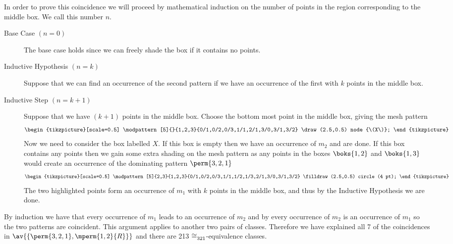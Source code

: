 In order to prove this coincidence we will proceed by mathematical
induction on the number of points in the region corresponding to the middle box.
We call this number \(n\).
\begin{description}
    \item [Base Case \((n=0)\)] The base case holds since we can freely shade the
        box if it contains no points.
    \item [Inductive Hypothesis \((n=k)\)] Suppose that we can find an occurrence
        of the second pattern if we have an occurrence of the first with \(k\) points
        in the middle box.
    \item [Inductive Step \((n=k+1)\)] Suppose that we have \((k+1)\) points in
        the middle box. Choose the bottom most point in the middle box, giving the
        mesh pattern
     \begin{equation*}
        \begin{tikzpicture}[scale=0.5]
            \modpattern[5]{}{1,2,3}{0/1,0/2,0/3,1/1,2/1,3/0,3/1,3/2}
            \draw (2.5,0.5) node {\(X\)};
        \end{tikzpicture}
    \end{equation*}
        Now we need to consider the box labelled \(X\). If this box is empty
        then we have an occurrence of \(m_2\) and are done. If this box contains
        any points then we gain some extra shading on the mesh pattern as any
        points in the boxes \(\boks{1,2}\) and \(\boks{1,3}\) would create an
        occurrence of the dominating pattern \(\perm{3,2,1}\)
     \begin{equation*}
        \begin{tikzpicture}[scale=0.5]
            \modpattern[5]{2,3}{1,2,3}{0/1,0/2,0/3,1/1,1/2,1/3,2/1,3/0,3/1,3/2}
            \filldraw (2.5,0.5) circle (4 pt);
        \end{tikzpicture}
    \end{equation*}
        The two highlighted points form an occurrence of \(m_1\) with \(k\)
        points in the middle box, and thus by the Inductive Hypothesis we
        are done.
\end{description}
By induction we have that every occurrence of \(m_1\) leads to an occurrence of \(m_2\)
and by  every occurrence of \(m_2\) is an occurrence of
\(m_1\) so the two patterns are coincident.
This argument applies to another two pairs of classes. Therefore we have
explained all 7 of the coincidences in \(\av{\{\perm{3,2,1}, \mperm{1,2}{R}\}}\)
and there are 213 \(\cong_{321}^\text{}\)-equivalence classes.
